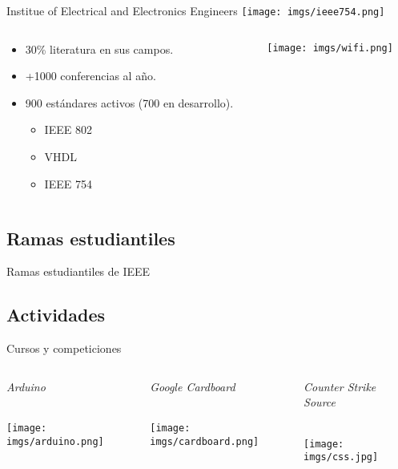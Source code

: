 \begin{frame}{Institue of Electrical and Electronics Engineers}
    \centering
    \texttt{[image: imgs/ieee754.png]}
    
    \begin{columns}\begin{column}{0.6\textwidth}
        \begin{itemize}
            \item 30\% literatura en sus campos.
            \item +1000 conferencias al año.
            \item 900 estándares activos (700 en desarrollo).
            \begin{itemize}
                \item IEEE 802
                \item VHDL
                \item IEEE 754
            \end{itemize}
        \end{itemize}
    \end{column}\begin{column}{0.4\textwidth}
        \texttt{[image: imgs/wifi.png]}
    \end{column}\end{columns}
\end{frame}

\subsection{Ramas estudiantiles}
\begin{frame}{Ramas estudiantiles de IEEE}
\end{frame}

\subsection{Actividades}
\begin{frame}{Cursos y competiciones}   
    \begin{columns}\begin{column}{0.33\textwidth}
        \centering\large\textit{Arduino} \\~
        
        \texttt{[image: imgs/arduino.png]}
    \end{column}\begin{column}{0.33\textwidth}
        \centering\large\textit{Google Cardboard} \\~
        
        \texttt{[image: imgs/cardboard.png]}
    \end{column}\begin{column}{0.33\textwidth}
        \centering\large\textit{Counter Strike Source} \\~
        
        \texttt{[image: imgs/css.jpg]}
    \end{column}\end{columns}
\end{frame}

